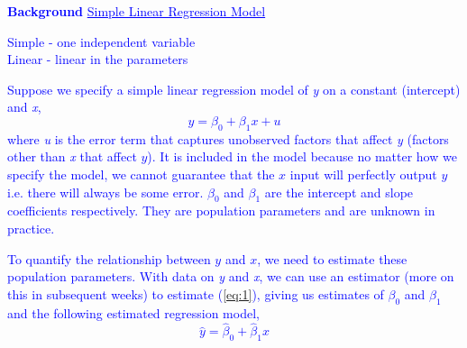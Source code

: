 \documentclass[12pt]{report}
\newenvironment{blueframed}[1][blue]
{\def\FrameCommand{\fboxsep=\FrameSep\fcolorbox{#1}{white}}%
	\MakeFramed {\advance\hsize-\width \FrameRestore}}
{\endMakeFramed}
\begin{document}
		\justify
		\begin{blueframed}
			\textcolor{blue}{\textbf{Background}}
			\vspace{-\baselineskip}
			\justify
			\textcolor{blue}{\underline{Simple Linear Regression Model}}
			
			\noindent \textcolor{blue}
			{
				\noindent Simple - one independent variable \\
				Linear - linear in the parameters
			}	
		
			\noindent \textcolor{blue}
			{
				\noindent Suppose we specify a simple linear regression model of \textit{y} on a constant (intercept) and \textit{x},
				\begin{equation}
					y = \beta_0 + \beta_1x + u \label{eq:1}
				\end{equation}
				where \textit{u} is the error term that captures unobserved factors that affect \textit{y} (factors other than \textit{x} that affect $y$). It is included in the model because no matter how we specify the model, we cannot guarantee that the $x$ input will perfectly output $y$ i.e. there will always be some error. $\beta_0$ and $\beta_1$ are the intercept and slope coefficients respectively. They are population parameters and are unknown in practice.
			}
		
		\noindent \textcolor{blue}
			{	
				\noindent To quantify the relationship between $y$ and $x$, we need to estimate these population parameters. With data on \textit{y} and \textit{x}, we can use an estimator (more on this in subsequent weeks) to estimate (\ref{eq:1}), giving us estimates of $\beta_0$ and $\beta_1$ and the following estimated regression model,
				\begin{equation}
					\hat{y} = \hat{\beta}_0 + \hat{\beta}_1x \label{eq:2}
				\end{equation}
			}
		\end{blueframed}
		
\end{document}
